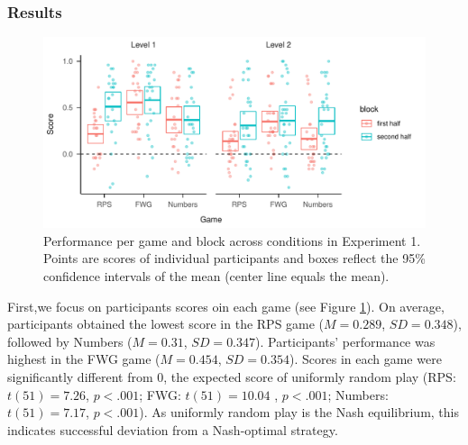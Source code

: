\documentclass[english,man,floatsintext]{apa6}
\begin{document}
\hypertarget{results}{%
\subsubsection{Results}\label{results}}

\begin{figure}

{\centering \includegraphics{paper_draft_2021_files/figure-latex/exp1-avg-scores-game-1} 

}

\caption{Performance per game and block across conditions in Experiment 1. Points are scores of individual participants and boxes reflect the 95\% confidence intervals of the mean (center line equals the mean).}\label{fig:exp1-avg-scores-game}
\end{figure}

First,we focus on participants scores oin each game (see Figure \ref{fig:exp1-avg-scores-game}). On average, participants obtained the lowest score in the RPS game (\(M = 0.289\), \(SD = 0.348\)), followed by Numbers (\(M = 0.31\), \(SD = 0.347\)). Participants' performance was highest in the FWG game (\(M = 0.454\), \(SD = 0.354\)). Scores in each game were significantly different from 0, the expected score of uniformly random play (RPS: \(t(51) = 7.26\), \(p < .001\); FWG: \(t(51) = 10.04\) , \(p < .001\); Numbers: \(t(51) = 7.17\), \(p < .001\)). As uniformly random play is the Nash equilibrium, this indicates successful deviation from a Nash-optimal strategy.
\end{document}
